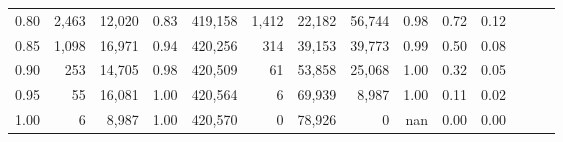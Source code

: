 \begin{tabular}{rrrrrrrrrrrrrr}
0.80 &   2,463 &  12,020 &  0.83 &  419,158 &    1,412 &  22,182 &  56,744 &  0.98 &  0.72 &      0.12 \\
0.85 &   1,098 &  16,971 &  0.94 &  420,256 &      314 &  39,153 &  39,773 &  0.99 &  0.50 &      0.08 \\
0.90 &     253 &  14,705 &  0.98 &  420,509 &       61 &  53,858 &  25,068 &  1.00 &  0.32 &      0.05 \\
0.95 &      55 &  16,081 &  1.00 &  420,564 &        6 &  69,939 &   8,987 &  1.00 &  0.11 &      0.02 \\
1.00 &       6 &   8,987 &  1.00 &  420,570 &        0 &  78,926 &       0 &   nan &  0.00 &      0.00 \\
\bottomrule
\end{tabular}
